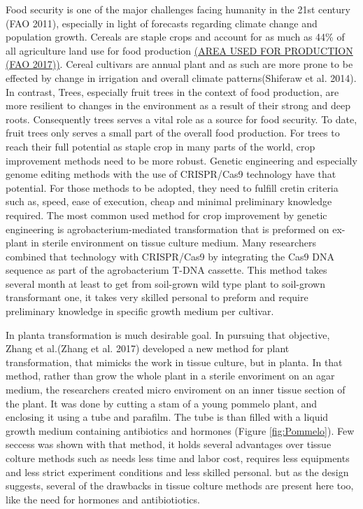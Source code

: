 \documentclass[
]{article}
\begin{document}
Food security is one of the major challenges facing humanity in the 21st
century (FAO 2011), especially in light of forecasts regarding climate
change and population growth. Cereals are staple crops and account for
as much as 44\% of all agriculture land use for food production
\href{https://ourworldindata.org/grapher/global-agricultural-land-use-by-major-crop-type}{(AREA
USED FOR PRODUCTION (FAO 2017))}. Cereal cultivars are annual plant and
as such are more prone to be effected by change in irrigation and
overall climate patterns(Shiferaw et al. 2014). In contrast, Trees,
especially fruit trees in the context of food production, are more
resilient to changes in the environment as a result of their strong and
deep roots. Consequently trees serves a vital role as a source for food
security. To date, fruit trees only serves a small part of the overall
food production. For trees to reach their full potential as staple crop
in many parts of the world, crop improvement methods need to be more
robust. Genetic engineering and especially genome editing methods with
the use of CRISPR/Cas9 technology have that potential. For those methods
to be adopted, they need to fulfill cretin criteria such as, speed, ease
of execution, cheap and minimal preliminary knowledge required. The most
common used method for crop improvement by genetic engineering is
agrobacterium-mediated transformation that is preformed on ex-plant in
sterile environment on tissue culture medium. Many researchers combined
that technology with CRISPR/Cas9 by integrating the Cas9 DNA sequence as
part of the agrobacterium T-DNA cassette. This method takes several
month at least to get from soil-grown wild type plant to soil-grown
transformant one, it takes very skilled personal to preform and require
preliminary knowledge in specific growth medium per cultivar.

In planta transformation is much desirable goal. In pursuing that
objective, Zhang et al.(Zhang et al. 2017) developed a new method for
plant transformation, that mimicks the work in tissue culture, but in
planta. In that method, rather than grow the whole plant in a sterile
envoriment on an agar medium, the researchers created micro enviroment
on an inner tissue section of the plant. It was done by cutting a stam
of a young pommelo plant, and enclosing it using a tube and parafilm.
The tube is than filled with a liquid growth medium containing
antibiotics and hormones (Figure \ref{fig:Pommelo}). Few seccess was
shown with that method, it holds several advantages over tissue colture
methods such as needs less time and labor cost, requires less equipments
and less strict experiment conditions and less skilled personal. but as
the design suggests, several of the drawbacks in tissue colture methods
are present here too, like the need for hormones and antibiotiotics.
\end{document}
